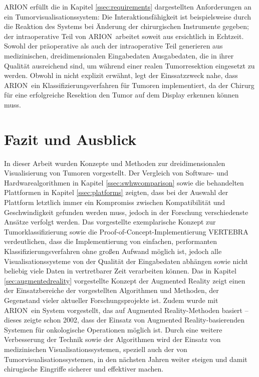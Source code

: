\documentclass[ngerman,pdftex,paper=A4,DIV=calc,titlepage,12pt]{scrartcl}
\newtheorem[L]{boxedDefinition}{Definition}
\begin{document}
ARION erfüllt die in Kapitel \ref{ssec:requirements} dargestellten Anforderungen an ein Tumorvisualisationssystem: Die Interaktionsfähigkeit ist beispielsweise durch die Reaktion des Systems bei Änderung der chirurgischen Instrumente gegeben; der intraoperative Teil von ARION\texttrademark\ arbeitet soweit aus \cite{Suthau2002DE} ersichtlich in Echtzeit. Sowohl der präoperative  als auch der intraoperative Teil generieren aus medizinischen, dreidimensionalen Eingabedaten Ausgabedaten, die in ihrer Qualität ausreichend sind, um während einer realen Tumorresektion eingesetzt zu werden. Obwohl in \cite{Suthau2002DE} nicht explizit erwähnt, legt der Einssatzzweck nahe, dass ARION\texttrademark\ ein Klassifizierungsverfahren für Tumoren implementiert, da der Chirurg für eine erfolgreiche Resektion den Tumor auf dem Display erkennen können muss.

\section{Fazit und Ausblick}\label{sec:facit}
In dieser Arbeit wurden Konzepte und Methoden zur dreidimensionalen Visualisierung von Tumoren vorgestellt.
Der Vergleich von Software- und Hardwarealgorithmen in Kapitel \ref{ssec:swhwcomparison} sowie die behandelten Plattformen in Kapitel \ref{ssec:platforms} zeigten, dass bei der Auswahl der Plattform letztlich immer ein Kompromiss zwischen Kompatibilität und Geschwindigkeit gefunden werden muss, jedoch in der Forschung verschiedenste Ansätze verfolgt werden. Das vorgestellte exemplarische Konzept zur Tumorklassifizierung sowie die Proof-of-Concept-Implementierung VERTEBRA verdeutlichen, dass die Implementierung von einfachen, performanten Klassifizierungsverfahren ohne großen Aufwand möglich ist, jedoch alle Visualisationssysteme von der Qualität der Eingabedaten abhängen sowie nicht beliebig viele Daten in vertretbarer Zeit verarbeiten können.
Das in Kapitel \ref{sec:augmentedreality} vorgestellte Konzept der Augmented Reality zeigt einen der Einsatzbereiche der vorgestellten Algorithmen und Methoden, der Gegenstand vieler aktueller Forschungsprojekte ist. Zudem wurde mit ARION\texttrademark\ ein System vorgestellt, das auf Augmented Reality-Methoden basiert -- dieses zeigte schon 2002, dass der Einsatz von Augmented Reality-basierenden Systemen für onkologische Operationen möglich ist. Durch eine weitere Verbesserung der Technik sowie der Algorithmen wird der Einsatz von medizinischen Visualisationssystemen, speziell auch der von Tumorvisualisationssystemen, in den nächsten Jahren weiter steigen und damit chirugische Eingriffe sicherer und effektiver machen.
\end{document}
